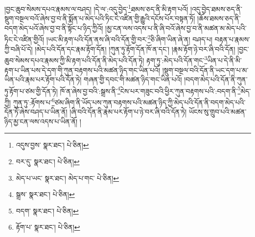 །བྱང་ཆུབ་སེམས་དཔའ་རྣམས་ལ་བཤད། །དེ་ལ་:འདུ་བྱེད་\footnote{འདུས་བྱས་  སྣར་ཐང་།  པེ་ཅིན། }ཐམས་ཅད་ནི་མི་རྟག་པའོ། །འདུ་བྱེད་ཐམས་ཅད་ནི་སྡུག་བསྔལ་བའོ་ཞེས་བྱ་བ་ནི་སྨོན་པ་མེད་པའི་ཏིང་ངེ་འཛིན་གྱི་རྒྱུའི་དངོས་པོར་བསྟན་ཏོ། །ཆོས་ཐམས་ཅད་ནི་བདག་མེད་པའོ་ཞེས་བྱ་བ་ནི་སྟོང་པ་ཉིད་ཀྱིའོ། །མྱ་ངན་ལས་འདས་པ་ནི་ཞི་བའོ་ཞེས་བྱ་བ་ནི་མཚན་མ་མེད་པའི་ཏིང་ངེ་འཛིན་གྱིའོ། །ཡང་མི་རྟག་པའི་དོན་ནས་ཞི་བའི་དོན་གྱི་བར་\footnote{བར་དུ་  སྣར་ཐང་།  པེ་ཅིན། }ཅི་ཞིག་ཡིན་ཞེ་ན། བཤད་པ། བརྟན་པ་རྣམས་ཀྱི་བཞི་པོ་དེ། །མེད་པའི་དོན་དང་རྣམ་རྟོག་དོན། །ཀུན་ཏུ་རྟོག་དོན་ཁོ་ན་དང་། །རྣམ་རྟོག་ཉེ་བར་ཞི་བའི་དོན། །བྱང་ཆུབ་སེམས་དཔའ་རྣམས་ཀྱི་མི་རྟག་པའི་དོན་ནི་མེད་པའི་དོན་ཏེ། རྟག་ཏུ་:མེད་པའི་དོན་གང་\footnote{མེད་པ་ཡང་  སྣར་ཐང་། མེད་པ་གང་  པེ་ཅིན། }ཡིན་པ་དེ་ནི་མི་རྟག་པ་ཡིན་པས་དེ་དག་གི་ཀུན་བརྟགས་པའི་མཚན་ཉིད་གང་ཡིན་པའོ། །སྡུག་བསྔལ་བའི་དོན་ནི་ཡང་དག་པ་མ་ཡིན་པའི་རྣམ་པར་རྟོག་པའི་དོན་ཏེ། གཞན་གྱི་དབང་གི་མཚན་ཉིད་གང་ཡིན་པའོ། །བདག་མེད་པའི་དོན་ནི་ཀུན་ཏུ་རྟོག་པ་ཙམ་གྱི་དོན་ཏེ། ཁོ་ན་ཞེས་བྱ་བའི་:སྒྲས་ནི་\footnote{སྒྲས་  སྣར་ཐང་།  པེ་ཅིན། }ངེས་པར་གཟུང་བའི་ཕྱིར་ཀུན་བརྟགས་པའི་:བདག་ནི་\footnote{བདག་  སྣར་ཐང་།  པེ་ཅིན། }མེད་ཀྱི། ཀུན་ཏུ་:རྟོགས་པ་\footnote{རྟོག་པ་  སྣར་ཐང་།  པེ་ཅིན། }ཙམ་ཞིག་ནི་ཡོད་པས་ཀུན་བརྟགས་པའི་མཚན་ཉིད་ཀྱི་མེད་པའི་དོན་ནི་བདག་མེད་པའི་དོན་ཏོ་ཞེས་བཤད་པ་ཡིན་ནོ། །ཞི་བའི་དོན་ནི་རྣམ་པར་རྟོག་པ་ཉེ་བར་ཞི་བའི་དོན་ཏེ། ཡོངས་སུ་གྲུབ་པའི་མཚན་ཉིད་མྱ་ངན་ལས་འདས་པ་ཡིན་ནོ། །
